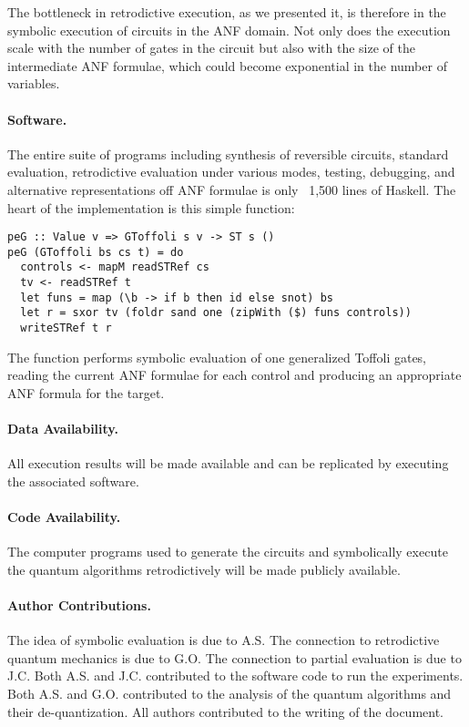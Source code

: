 \documentclass{article}
\begin{document}
\begin{refsection}
The bottleneck in retrodictive execution, as we presented it, is
therefore in the symbolic execution of circuits in the ANF domain. Not
only does the execution scale with the number of gates in the circuit
but also with the size of the intermediate ANF formulae, which could
become exponential in the number of variables.

\paragraph*{Software.}
The entire suite of programs including synthesis of reversible
circuits, standard evaluation, retrodictive evaluation under various
modes, testing, debugging, and alternative representations off ANF
formulae is only ~1,500 lines of Haskell. The heart of the
implementation is this simple function:

\begin{verbatim}
peG :: Value v => GToffoli s v -> ST s ()
peG (GToffoli bs cs t) = do
  controls <- mapM readSTRef cs
  tv <- readSTRef t
  let funs = map (\b -> if b then id else snot) bs
  let r = sxor tv (foldr sand one (zipWith ($) funs controls))
  writeSTRef t r
\end{verbatim}
The function performs symbolic evaluation of one generalized Toffoli
gates, reading the current ANF formulae for each control and producing
an appropriate ANF formula for the target.

\paragraph*{Data Availability.}
All execution results will be made available and can be replicated by
executing the associated software.

\paragraph*{Code Availability.}
The computer programs used to generate the circuits and symbolically
execute the quantum algorithms retrodictively will be made publicly
available.

\paragraph*{Author Contributions.}
The idea of symbolic evaluation is due to A.S. The connection to
retrodictive quantum mechanics is due to G.O. The connection to
partial evaluation is due to J.C. Both A.S. and J.C. contributed to
the software code to run the experiments. Both A.S. and
G.O. contributed to the analysis of the quantum algorithms and their
de-quantization. All authors contributed to the writing of the
document.


\end{refsection}
\end{document}
